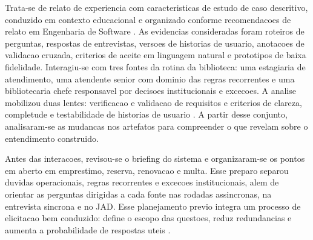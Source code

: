\documentclass[12pt]{article}
\begin{document}
%
%
%
Trata-se de relato de experiencia com caracteristicas de estudo de caso descritivo, conduzido em contexto educacional e organizado conforme recomendacoes de relato em Engenharia de Software \cite{runeson2009guidelines}. As evidencias consideradas foram roteiros de perguntas, respostas de entrevistas, versoes de historias de usuario, anotacoes de validacao cruzada, criterios de aceite em linguagem natural e prototipos de baixa fidelidade. Interagiu-se com tres fontes da rotina da biblioteca: uma estagiaria de atendimento, uma atendente senior com dominio das regras recorrentes e uma bibliotecaria chefe responsavel por decisoes institucionais e excecoes. A analise mobilizou duas lentes: verificacao e validacao de requisitos \cite{sakthivel1991verification} e criterios de clareza, completude e testabilidade de historias de usuario \cite{lucassen2016qus}. A partir desse conjunto, analisaram-se as mudancas nos artefatos para compreender o que revelam sobre o entendimento construido.

%
Antes das interacoes, revisou-se o briefing do sistema e organizaram-se os pontos em aberto em emprestimo, reserva, renovacao e multa. Esse preparo separou duvidas operacionais, regras recorrentes e excecoes institucionais, alem de orientar as perguntas dirigidas a cada fonte nas rodadas assincronas, na entrevista sincrona e no JAD. Esse planejamento previo integra um processo de elicitacao bem conduzido: define o escopo das questoes, reduz redundancias e aumenta a probabilidade de respostas uteis \cite{hickey2004unified}.
\end{document}

